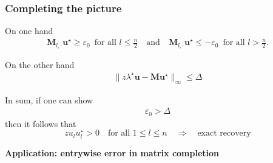 \documentclass[compress,
mathserif,wide,%
]{beamer}
\begin{document}
%
%

\begin{frame}
	\frametitle{Completing the picture}
	On one hand 
	\begin{align*}
	 \bm{M}_{l,\cdot}\bm{u}^{\star}   \geq \varepsilon_0 \,\,\,\text{for all }l\leq \frac{n}{2}
	\quad\text{and}\quad
	   \bm{M}_{l,\cdot} \bm{u}^{\star}  
	\leq - \varepsilon_0 \,\,\, \text{for all } l > \frac{n}{2}. 
\end{align*}

On the other hand	
	\begin{align*}
	\big\| z\lambda^{\star}\bm{u}-\bm{M}\bm{u}^{\star} \big\|_{\infty} \leq \Delta
	\end{align*}


In sum,  if one can show 
%
\begin{align*}
	\varepsilon_{0}  > \Delta
\end{align*}
%
then it follows that
%
\[
zu_{l} u_{l}^{\star}>0\quad\text{for all }1\leq l\leq n \quad \Longrightarrow \quad \text{exact recovery}
\]

\end{frame}




\begin{frame}[plain]
\vfill
\centering
{\large \bf Application: entrywise error in matrix completion}
\vfill
\end{frame}
\end{document}
